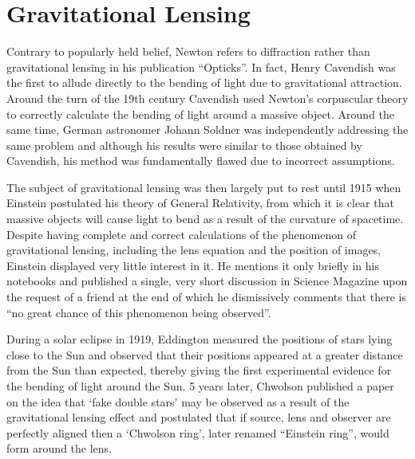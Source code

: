
\newpage
\section{Gravitational Lensing} %
\label{sec:gravitational_lensing}

		Contrary to popularly held belief, Newton refers to diffraction rather than gravitational lensing in his publication ``Opticks''\cite{Newton_Opticks}. In fact, Henry Cavendish was the first to allude directly to the bending of light due to gravitational attraction. Around the turn of the 19th century Cavendish used Newton's corpuscular theory to correctly calculate the bending of light around a massive object.  Around the same time, German astronomer Johann Soldner was independently addressing the same problem\cite{Soldner} and although his results were similar to those obtained by Cavendish, his method was fundamentally flawed due to incorrect assumptions\cite{Conceptual_origins_of_GL}.

		The subject of gravitational lensing was then largely put to rest until 1915 when Einstein postulated his theory of General Relativity, from which it is clear that massive objects will cause light to bend as a result of the curvature of spacetime. Despite having complete and correct calculations of the phenomenon of gravitational lensing, including the lens equation and the position of images, Einstein displayed very little interest in it. He mentions it only briefly in his notebooks and published a single, very short discussion in Science Magazine upon the request of a friend at the end of which he dismissively comments that there is ``no great chance of this phenomenon being observed''\cite{Einstein_science_magazine}.

		During a solar eclipse in 1919, Eddington measured the positions of stars lying close to the Sun and observed that their positions appeared at a greater distance from the Sun than expected, thereby giving the first experimental evidence for the bending of light around the Sun\cite{Eddington_GL_evidence}. 5 years later, Chwolson published a paper on the idea that `fake double stars' may be observed as a result of the gravitational lensing effect and postulated that if source, lens and observer are perfectly aligned then a `Chwolson ring', later renamed ``Einstein ring'', would form around the lens\cite{Conceptual_origins_of_GL}.

